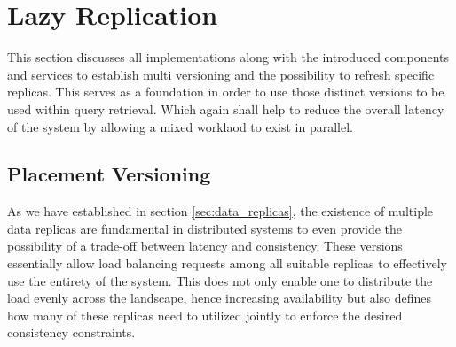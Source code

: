 

\section{Lazy Replication}
\label{sec:lazy_replication}

This section discusses all implementations along with the introduced components and services to establish 
multi versioning and the possibility to refresh specific replicas. This serves as a foundation in order to use those distinct versions
to be used within query retrieval. Which again shall help to reduce the overall latency of the system by allowing a mixed worklaod to exist in parallel.



\subsection{Placement Versioning}

As we have established in section \ref{sec:data_replicas}, the existence of multiple data replicas are fundamental in distributed systems to even provide the 
possibility of a trade-off between latency and consistency. These versions essentially allow load balancing requests among all suitable replicas to effectively 
use the entirety of the system. This does not only enable one to distribute the load evenly across the landscape, hence increasing availability
but also defines how many of these replicas need to utilized jointly to enforce the desired consistency constraints.\\

